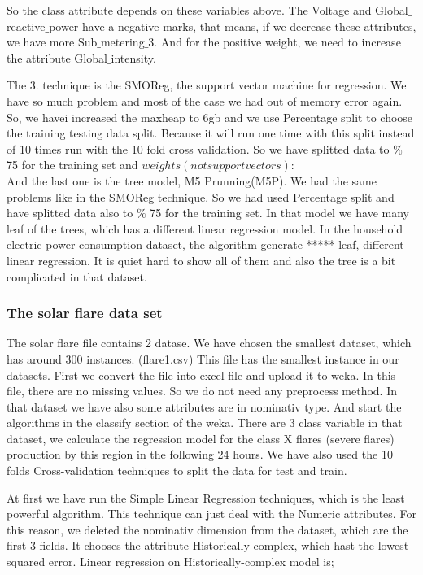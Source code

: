 \documentclass[a4paper]{article}
\begin{document}
So the class attribute depends on these variables above. The Voltage and Global$\_$reactive$\_$power have a negative marks, that means, if we decrease these attributes, we have more Sub$\_$metering$\_$3. And for the positive weight, we need to increase the attribute Global$\_$intensity.

The 3. technique is the SMOReg, the support vector machine for regression. We have so much problem and most of the case we had out of memory error again. So, we havei increased the maxheap to 6gb and we use Percentage split to choose the training testing data split. Because it will run one time with this split instead of 10 times run with the 10 fold cross validation. So we have splitted data to $\%$ 75 for the training set and %
$weights (not support vectors):
$\\

And the last one is the tree model, M5 Prunning(M5P). We had the same problems like in the SMOReg technique. So we had used Percentage split and have splitted data also to $\%$ 75 for the training set. In that model we have many leaf of the trees, which has a different linear regression model. In the household electric power consumption dataset, the algorithm generate *****  leaf, different linear regression. It is quiet hard to show all of them and also the tree is a bit complicated in that dataset.

\subsubsection{The solar flare data set}
The solar flare file contains 2 datase. We have chosen the smallest dataset, which has around 300 instances. (flare1.csv) This file has the smallest instance in our datasets. First we convert the file into excel file and upload it to weka. In this file, there are no missing values. So we do not need any preprocess method. In that dataset we have also some attributes are in nominativ type. And start the algorithms in the classify section of the weka. There are 3 class variable in that dataset, we calculate the regression model for the class X flares (severe flares) production by this region in the following 24 hours. We have also used the 10 folds Cross-validation techniques to split the data for test and train. 

At first we have run the Simple Linear Regression techniques, which is the least powerful algorithm. This technique can just deal with the Numeric attributes. For this reason, we deleted the nominativ dimension from the dataset, which are the first 3 fields. It chooses the attribute Historically-complex, which hast the lowest squared error. Linear regression on Historically-complex model is; 
\end{document}
